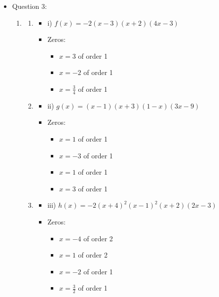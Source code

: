 \documentclass{article}
\begin{document}
\begin{itemize}
\item Question 3:\\
\begin{enumerate}
    \item 
    \begin{enumerate}
        \item 
        \begin{itemize}
            \item i) $f(x) = -2(x - 3)(x + 2)(4x - 3)$
            \item Zeros:
                \begin{itemize}
                    \item $x = 3$ of order 1
                    \item $x = -2$ of order 1
                    \item $x = \frac{3}{4}$ of order 1
                \end{itemize}
        \end{itemize}
        
        \item 
        \begin{itemize}
            \item ii) $g(x) = (x - 1)(x + 3)(1 - x)(3x - 9)$
            \item Zeros:
                \begin{itemize}
                    \item $x = 1$ of order 1
                    \item $x = -3$ of order 1
                    \item $x = 1$ of order 1
                    \item $x = 3$ of order 1
                \end{itemize}
        \end{itemize}
        
        \item 
        \begin{itemize}
            \item iii) $h(x) = -2(x + 4)^2(x - 1)^2(x + 2)(2x - 3)$
            \item Zeros:
                \begin{itemize}
                    \item $x = -4$ of order 2
                    \item $x = 1$ of order 2
                    \item $x = -2$ of order 1
                    \item $x = \frac{3}{2}$ of order 1
                \end{itemize}
        \end{itemize}
        

\end{enumerate}
\end{enumerate}
\end{itemize}
\end{document}
